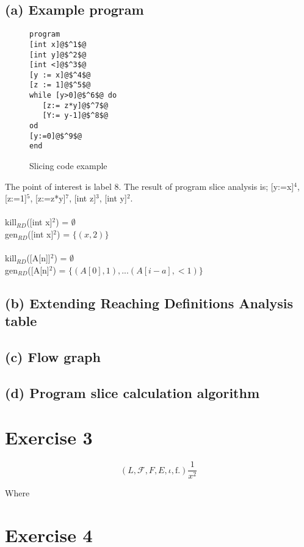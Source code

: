 \documentclass[12pt]{article}
\begin{document}
\subsection*{(a) Example program}
\begin{figure}
\begin{lstlisting}
program
[int x]@$^1$@
[int y]@$^2$@
[int <]@$^3$@
[y := x]@$^4$@
[z := 1]@$^5$@
while [y>0]@$^6$@ do
   [z:= z*y]@$^7$@
   [Y:= y-1]@$^8$@
od
[y:=0]@$^9$@
end
\end{lstlisting}
\label{source:example2}
\caption{Slicing code example}
\end{figure}

The point of interest is label 8.  The result of program slice analysis is; [y:=x]$^4$, [z:=1]$^5$, [z:=z*y]$^7$, [int z]$^3$, [int y]$^2$.\\\\

kill$_{RD}$([int x]$^2$) = $\emptyset$\\
gen$_{RD}$([int x]$^2$) = $\{(x,2)\}$\\\\

kill$_{RD}$([A[n]]$^2$) = $\emptyset$\\
gen$_{RD}$([A[n]$^2$) = $\{(A[0],1), ... (A[i-a],<1)\}$\\


\subsection*{(b) Extending Reaching Definitions Analysis table}
\subsection*{(c) Flow graph}
\subsection*{(d) Program slice calculation algorithm}
\section*{Exercise 3}

\begin{equation}
  \left(L, \mathcal{F}, F, E, \iota, \mathrm{f}.  \right) \frac{1}{x^2}
  \label{eq:hej}
\end{equation}

Where 

\section*{Exercise 4}
\end{document}
